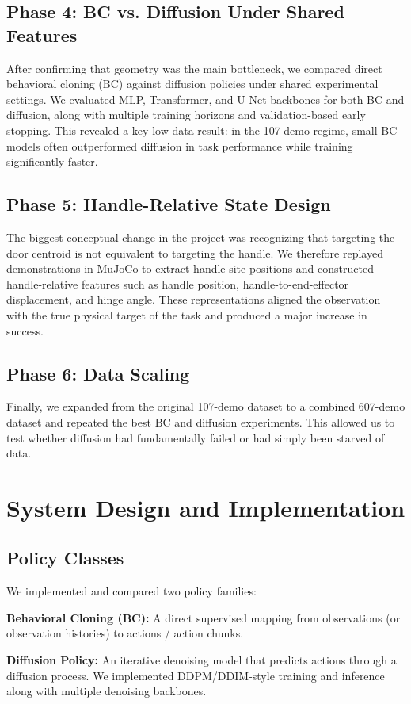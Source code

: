 \documentclass[10pt,conference]{IEEEtran}
\begin{document}
\subsection{Phase 4: BC vs. Diffusion Under Shared Features}
After confirming that geometry was the main bottleneck, we compared direct behavioral cloning (BC) against diffusion policies under shared experimental settings. We evaluated MLP, Transformer, and U-Net backbones for both BC and diffusion, along with multiple training horizons and validation-based early stopping. This revealed a key low-data result: in the 107-demo regime, small BC models often outperformed diffusion in task performance while training significantly faster.

\subsection{Phase 5: Handle-Relative State Design}
The biggest conceptual change in the project was recognizing that targeting the door centroid is not equivalent to targeting the handle. We therefore replayed demonstrations in MuJoCo to extract handle-site positions and constructed handle-relative features such as handle position, handle-to-end-effector displacement, and hinge angle. These representations aligned the observation with the true physical target of the task and produced a major increase in success.

\subsection{Phase 6: Data Scaling}
Finally, we expanded from the original 107-demo dataset to a combined 607-demo dataset and repeated the best BC and diffusion experiments. This allowed us to test whether diffusion had fundamentally failed or had simply been starved of data.

\section{System Design and Implementation}
\subsection{Policy Classes}
We implemented and compared two policy families:

\textbf{Behavioral Cloning (BC):} A direct supervised mapping from observations (or observation histories) to actions / action chunks.

\textbf{Diffusion Policy:} An iterative denoising model that predicts actions through a diffusion process. We implemented DDPM/DDIM-style training and inference along with multiple denoising backbones.
\end{document}
